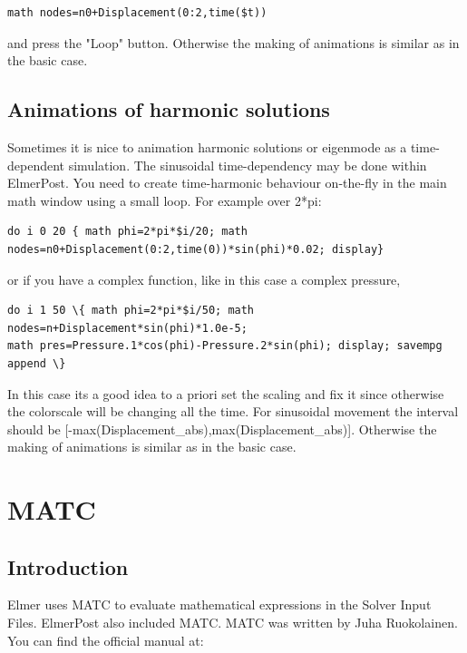 \begin{verbatim}
math nodes=n0+Displacement(0:2,time($t))
\end{verbatim}

and press the "Loop" button. Otherwise the making of animations is similar as in the basic case.

\subsection{Animations of harmonic solutions}

Sometimes it is nice to animation harmonic solutions or eigenmode as a time-dependent simulation. The sinusoidal time-dependency may be done within ElmerPost. You need to create time-harmonic behaviour on-the-fly in the main math window using a small loop. For example over 2*pi:

\begin{verbatim}
do i 0 20 { math phi=2*pi*$i/20; math 
nodes=n0+Displacement(0:2,time(0))*sin(phi)*0.02; display}
\end{verbatim}

or if you have a complex function, like in this case a complex pressure,

\begin{verbatim}
do i 1 50 \{ math phi=2*pi*$i/50; math nodes=n+Displacement*sin(phi)*1.0e-5; 
math pres=Pressure.1*cos(phi)-Pressure.2*sin(phi); display; savempg append \}
\end{verbatim}

In this case its a good idea to a priori set the scaling and fix it since otherwise the colorscale will be changing all the time. For sinusoidal movement the interval should be [-max(Displacement\_abs),max(Displacement\_abs)]. Otherwise the making of animations is similar as in the basic case.


\section{MATC}

\subsection{Introduction}

Elmer uses MATC to evaluate mathematical expressions in the Solver Input Files. ElmerPost also included MATC.  MATC was written by Juha Ruokolainen.  You can find the official manual at:\\

